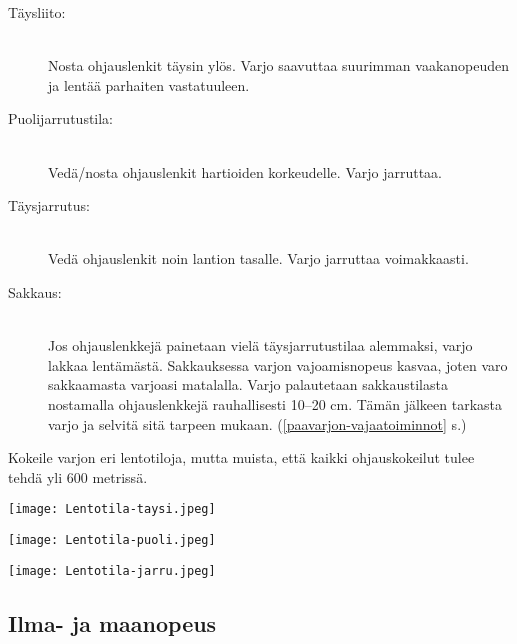 \begin{multicols}{2}
\begin{description}
\item[Täysliito: ] \hfill \\ 
Nosta ohjauslenkit täysin ylös. Varjo saavuttaa suurimman vaakanopeuden ja lentää parhaiten vastatuuleen. \hfill \\ 
\item[Puolijarrutustila: ] \hfill \\ 
Vedä/nosta ohjauslenkit hartioiden korkeudelle. Varjo jarruttaa.  \hfill \\ 
\item[Täysjarrutus: ] \hfill \\ 
Vedä ohjauslenkit noin lantion tasalle. Varjo jarruttaa voimakkaasti. \hfill \\ 
\item[Sakkaus:] \hfill \\ 
Jos ohjauslenkkejä painetaan vielä täysjarrutustilaa alemmaksi, varjo lakkaa lentämästä. Sakkauksessa varjon vajoamisnopeus kasvaa, joten varo sakkaamasta varjoasi matalalla. Varjo palautetaan sakkaustilasta nostamalla ohjauslenkkejä rauhallisesti 10–20 cm. Tämän jälkeen tarkasta varjo ja selvitä sitä tarpeen mukaan. (\ref{paavarjon-vajaatoiminnot} s.\pageref{paavarjon-vajaatoiminnot}) \hfill \\ 
\end{description}

Kokeile varjon eri lentotiloja, mutta muista, että kaikki ohjauskokeilut tulee tehdä yli 600 metrissä. 


\begin{Figure}\centering\texttt{[image: Lentotila-taysi.jpeg]}\end{Figure} \begin{Figure}\centering\texttt{[image: Lentotila-puoli.jpeg]}\end{Figure} 
\begin{Figure}\centering\texttt{[image: Lentotila-jarru.jpeg]}\end{Figure} 

\subsection{ Ilma- ja maanopeus }
\label{hyppytapahtuma-ilma-ja-maanopeus}



\end{multicols}
